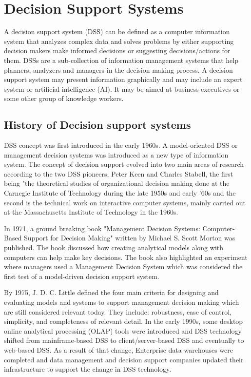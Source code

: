 \chapter{Decision Support Systems}
\renewcommand\textbullet{\ensuremath{\bullet}}
\label{ChapterTwo}
\indent A decision support system (DSS) can be defined as a computer information system that analyzes complex data and solves problems by either supporting decision makers make informed decisions or suggesting decisions/actions for them.\cite{shim2002past} DSSs are a sub-collection of information management systems that help planners, analyzers and managers in the decision making process.\cite{khodashahri2013decision} A decision support system may present information graphically and may include an expert system or artificial intelligence (AI). It may be aimed at business executives or some other group of knowledge workers.
\section{History of Decision support systems}
\label{sec:HistoryOfDecisionSupportSystems}
\indent DSS concept was first introduced in the early 1960s.\cite{power2007brief} A model-oriented DSS or management decision systems was introduced as a new type of information system. The concept of decision support evolved into two main areas of research according to the two DSS pioneers, Peter Keen and Charles Stabell, the first being "the theoretical studies of organizational decision making done at the Carnegie Institute of Technology during the late 1950s and early '60s and the second is the technical work on interactive computer systems, mainly carried out at the Massachusetts Institute of Technology in the 1960s.\cite{power2007brief}\cite{shim2002past}

\indent In 1971, a ground breaking book "Management Decision Systems: Computer-Based Support for Decision Making" written by Michael S. Scott Morton was published. The book discussed how creating analytical models along with computers can help make key decisions. The book also highlighted an experiment where managers used a Management Decision System which was considered the first test of a model-driven decision support system.\cite{power2007brief}

\indent By 1975, J. D. C. Little defined the four main criteria for designing and evaluating models and systems to support management decision making which are still considered relevant today. They include: robustness, ease of control, simplicity, and completeness of relevant detail.\cite{power2007brief} In the early 1990s, some desktop online analytical processing (OLAP) tools were introduced and DSS technology shifted from mainframe-based DSS to client/server-based DSS and eventually to web-based DSS.\cite{bhargava2001decision} As a result of that change, Enterprise data warehouses were completed and data management and decision support companies updated their infrastructure to support the change in DSS technology.

